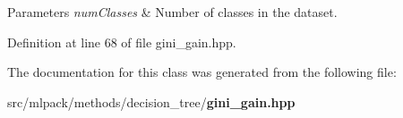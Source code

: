 \begin{DoxyParams}{Parameters}
{\em num\+Classes} & Number of classes in the dataset. \\
\hline
\end{DoxyParams}


Definition at line 68 of file gini\+\_\+gain.\+hpp.



The documentation for this class was generated from the following file\+:\begin{DoxyCompactItemize}
\item 
src/mlpack/methods/decision\+\_\+tree/{\bf gini\+\_\+gain.\+hpp}\end{DoxyCompactItemize}
